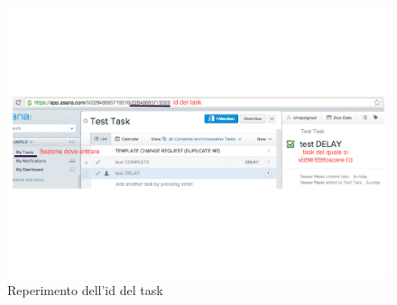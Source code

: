 				\begin{figure}[htbp]
					\centering
					\includegraphics[width=14cm]{images/select_id_task_asana.pdf}
					\caption{Reperimento dell'id del task}
					\label{fig:select_id_task_asana}
				\end{figure}

